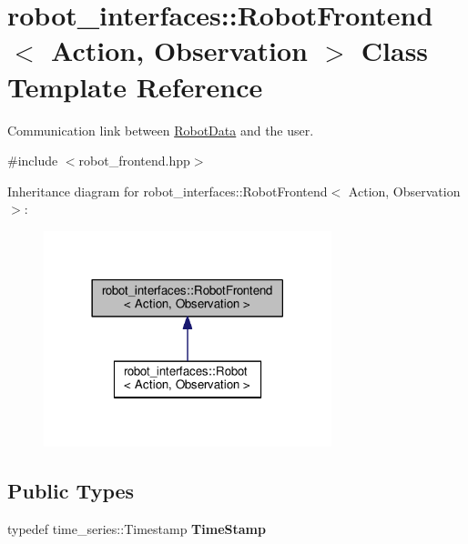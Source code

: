 \hypertarget{classrobot__interfaces_1_1RobotFrontend}{}\section{robot\+\_\+interfaces\+:\+:Robot\+Frontend$<$ Action, Observation $>$ Class Template Reference}
\label{classrobot__interfaces_1_1RobotFrontend}


Communication link between \hyperlink{classrobot__interfaces_1_1RobotData}{Robot\+Data} and the user.  




{\ttfamily \#include $<$robot\+\_\+frontend.\+hpp$>$}



Inheritance diagram for robot\+\_\+interfaces\+:\+:Robot\+Frontend$<$ Action, Observation $>$\+:
\nopagebreak
\begin{figure}[H]
\begin{center}
\leavevmode
\includegraphics[width=237pt]{classrobot__interfaces_1_1RobotFrontend__inherit__graph}
\end{center}
\end{figure}
\subsection*{Public Types}
\begin{DoxyCompactItemize}
\item 
typedef time\+\_\+series\+::\+Timestamp {\bfseries Time\+Stamp}\hypertarget{classrobot__interfaces_1_1RobotFrontend_a02bebc6c3e9822f026c48f970d80a865}{}\label{classrobot__interfaces_1_1RobotFrontend_a02bebc6c3e9822f026c48f970d80a865}

\end{DoxyCompactItemize}
